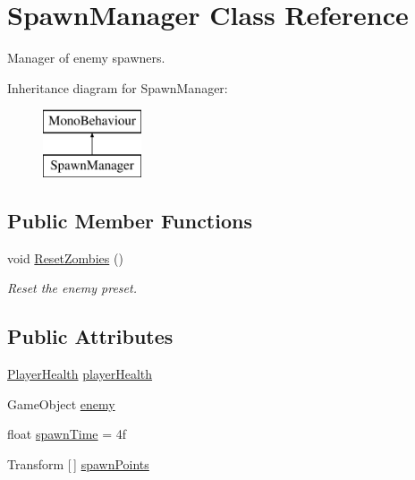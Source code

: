 \hypertarget{class_spawn_manager}{}\section{Spawn\+Manager Class Reference}
\label{class_spawn_manager}


Manager of enemy spawners.  


Inheritance diagram for Spawn\+Manager\+:\begin{figure}[H]
\begin{center}
\leavevmode
\includegraphics[height=2.000000cm]{class_spawn_manager}
\end{center}
\end{figure}
\subsection*{Public Member Functions}
\begin{DoxyCompactItemize}
\item 
void \mbox{\hyperlink{class_spawn_manager_a6dad11bc457d16e663c8c4a4994f2182}{Reset\+Zombies}} ()
\begin{DoxyCompactList}\small\item\em Reset the enemy preset. \end{DoxyCompactList}\end{DoxyCompactItemize}
\subsection*{Public Attributes}
\begin{DoxyCompactItemize}
\item 
\mbox{\hyperlink{class_player_health}{Player\+Health}} \mbox{\hyperlink{class_spawn_manager_ae1236e4e0a8291456b46cebfbd799324}{player\+Health}}
\item 
Game\+Object \mbox{\hyperlink{class_spawn_manager_adec1aee76f000ec159170d182b5e60df}{enemy}}
\item 
float \mbox{\hyperlink{class_spawn_manager_acb6b516157bae17819218c7e2436e5b7}{spawn\+Time}} = 4f
\item 
Transform \mbox{[}$\,$\mbox{]} \mbox{\hyperlink{class_spawn_manager_aaa2bc047315ee2c588161b09f06aaa3c}{spawn\+Points}}
\end{DoxyCompactItemize}
